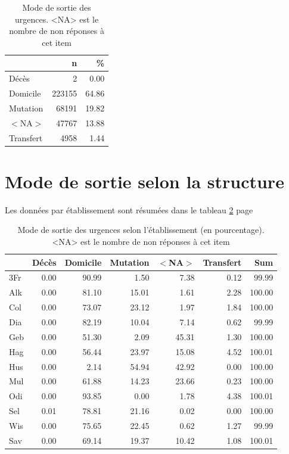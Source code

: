 \documentclass[12pt,english,french,twoside]{book}\usepackage[]{graphicx}\usepackage[]{color}
\begin{document}
\begin{table}[ht]
\centering
\begin{tabular}{|l|r|r|}
  \hline
 & n & \% \\ 
  \hline
Décès & 2 & 0.00 \\ 
  Domicile & 223155 & 64.86 \\ 
  Mutation & 68191 & 19.82 \\ 
  $<$NA$>$ & 47767 & 13.88 \\ 
  Transfert & 4958 & 1.44 \\ 
   \hline
\end{tabular}
\caption[Mode de sortie des urgences]{Mode de sortie des urgences. <NA> est le nombre de non réponses à cet item} 
\label{tab.sortie}
\end{table}



\section{Mode de sortie selon la structure}

Les données par établissement sont résumées dans le tableau \ref{tab.sortie_etab} page \pageref{tab.sortie_etab}

\begin{table}[ht]
\centering
\begin{tabular}{|l|r|r|r|r|r|r|}
  \hline
 & Décès & Domicile & Mutation & $<$NA$>$ & Transfert & Sum \\ 
  \hline
3Fr & 0.00 & 90.99 & 1.50 & 7.38 & 0.12 & 99.99 \\ 
  Alk & 0.00 & 81.10 & 15.01 & 1.61 & 2.28 & 100.00 \\ 
  Col & 0.00 & 73.07 & 23.12 & 1.97 & 1.84 & 100.00 \\ 
  Dia & 0.00 & 82.19 & 10.04 & 7.14 & 0.62 & 99.99 \\ 
  Geb & 0.00 & 51.30 & 2.09 & 45.31 & 1.30 & 100.00 \\ 
  Hag & 0.00 & 56.44 & 23.97 & 15.08 & 4.52 & 100.01 \\ 
  Hus & 0.00 & 2.14 & 54.94 & 42.92 & 0.00 & 100.00 \\ 
  Mul & 0.00 & 61.88 & 14.23 & 23.66 & 0.23 & 100.00 \\ 
  Odi & 0.00 & 93.85 & 0.00 & 1.78 & 4.38 & 100.01 \\ 
  Sel & 0.01 & 78.81 & 21.16 & 0.02 & 0.00 & 100.00 \\ 
  Wis & 0.00 & 75.65 & 22.45 & 0.62 & 1.27 & 99.99 \\ 
  Sav & 0.00 & 69.14 & 19.37 & 10.42 & 1.08 & 100.01 \\ 
   \hline
\end{tabular}
\caption[Mode de sortie selon l'établissement]{Mode de sortie des urgences selon l'établissement (en pourcentage). <NA> est le nombre de non réponses à cet item} 
\label{tab.sortie_etab}
\end{table}
\end{document}
